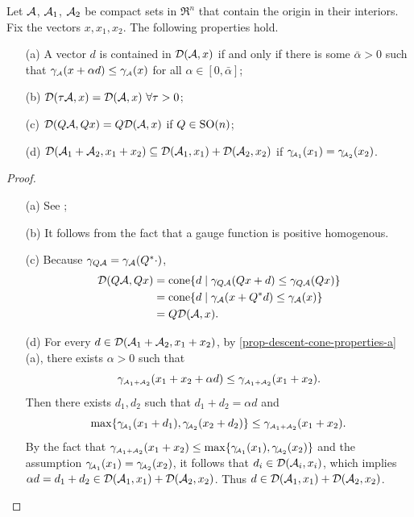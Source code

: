\begin{lemma}\label{prop-descent-cone-properties} Let $\mathcal{A}$, $\mathcal{A}_1$, $\mathcal{A}_2$ be compact sets in $\Re^n$ that contain the origin in their interiors. Fix the vectors $x, x_1, x_2$. The following properties hold.
    \begin{itemize}
     \item[(a)] \label{prop-descent-cone-properties-a}
       A vector $d$ is contained in $\mathcal{D}(\mathcal{A}, x)$ if and only if there is some $\bar\alpha > 0$ such that $\gamma_{\scriptscriptstyle\mathcal{A}}(x + \alpha d) \leq \gamma_{\scriptscriptstyle\mathcal{A}}(x)$ for all $\alpha \in [0, \bar\alpha]$;
     \item[(b)] \label{prop-descent-cone-properties-b}
       $\mathcal{D}(\tau\mathcal{A}, x) = \mathcal{D}(\mathcal{A}, x)\ \forall\tau > 0$;
     \item[(c)] \label{prop-descent-cone-properties-c}
       $\mathcal{D}(Q\mathcal{A}, Qx) = Q\mathcal{D}(\mathcal{A}, x)$ if $Q\in \operatorname{SO}(n)$;
     \item[(d)] \label{prop-descent-cone-properties-d}
       $\mathcal{D}(\mathcal{A}_1 + \mathcal{A}_2, x_1 + x_2) \subseteq \mathcal{D}(\mathcal{A}_1, x_1) + \mathcal{D}(\mathcal{A}_2, x_2)$ if $\gamma_{\!\scriptscriptstyle\mathcal{A}_1}(x_1) = \gamma_{\!\scriptscriptstyle\mathcal{A}_2}(x_2)$.
     \end{itemize}
\end{lemma} 

\begin{proof}
    \leavevmode
      \begin{itemize}
        \item[(a)] See \citep[Proposition 2.5]{mccoy2014sharp};
        \item[(b)] It follows from the fact that a gauge function is positive homogenous.  
        \item[(c)] Because $\gamma_{Q\mathcal{A}}=\gamma_{\mathcal{A}}(Q^*\cdot)$,
        \begin{align*}
          \mathcal{D}(Q\mathcal{A}, Qx) &= \operatorname{cone}\{d \mid \gamma_{Q\mathcal{A}}(Qx + d) \leq \gamma_{Q\mathcal{A}}(Qx)\}
          \\&= \operatorname{cone}\{d \mid \gamma_{\mathcal{A}}(x + Q^*d) \leq \gamma_{\mathcal{A}}(x)\}
          \\&= Q\mathcal{D}(\mathcal{A}, x).
        \end{align*}
        \item[(d)] 
        For every $d \in \mathcal{D}(\mathcal{A}_1 + \mathcal{A}_2, x_1 + x_2)$, by \autoref{prop-descent-cone-properties-a}(a), there exists $\alpha > 0$ such that  
        \[\gamma_{\scriptscriptstyle\mathcal{A}_1 + \scriptscriptstyle\mathcal{A}_2}(x_1 + x_2 + \alpha d) \leq \gamma_{\scriptscriptstyle\mathcal{A}_1 + \scriptscriptstyle\mathcal{A}_2}(x_1 + x_2).\] 
        Then there exists $d_1, d_2$ such that $d_1 + d_2 = \alpha d$ and 
        \[\max\{\gamma_{\!\scriptscriptstyle\mathcal{A}_1}(x_1 + d_1), \gamma_{\!\scriptscriptstyle\mathcal{A}_2}(x_2 + d_2)\} \leq \gamma_{\scriptscriptstyle\mathcal{A}_1 + \scriptscriptstyle\mathcal{A}_2}(x_1 + x_2).\]
        By the fact that $\gamma_{\scriptscriptstyle\mathcal{A}_1 + \scriptscriptstyle\mathcal{A}_2}(x_1 + x_2) \leq \max\{\gamma_{\!\scriptscriptstyle\mathcal{A}_1}(x_1), \gamma_{\!\scriptscriptstyle\mathcal{A}_2}(x_2)\}$ and the assumption $\gamma_{\!\scriptscriptstyle\mathcal{A}_1}(x_1) = \gamma_{\!\scriptscriptstyle\mathcal{A}_2}(x_2)$, it follows that $d_i \in \mathcal{D}(\mathcal{A}_i, x_i)$, which implies $\alpha d = d_1 + d_2 \in \mathcal{D}(\mathcal{A}_1, x_1) + \mathcal{D}(\mathcal{A}_2, x_2)$. Thus $d \in \mathcal{D}(\mathcal{A}_1, x_1) + \mathcal{D}(\mathcal{A}_2, x_2)$.
      \end{itemize}
\end{proof}

